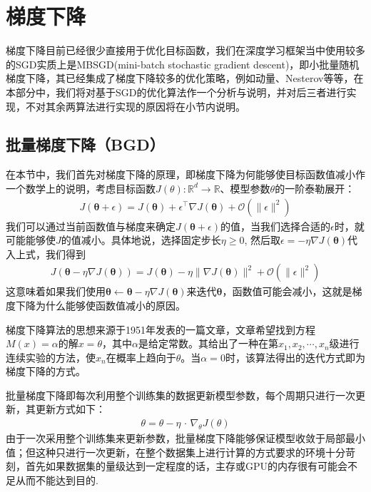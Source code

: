 \documentclass[10.5pt,a4paper]{article}%
\begin{document}
        \section{梯度下降}
        梯度下降目前已经很少直接用于优化目标函数，我们在深度学习框架当中使用较多的SGD实质上是MBSGD(mini-batch stochastic gradient descent)，即小批量随机梯度下降，其已经集成了梯度下降较多的优化策略，例如动量、Nesterov等等，在本部分中，我们将对基于SGD的优化算法作一个分析与说明，并对后三者进行实现，不对其余两算法进行实现的原因将在小节内说明。
        \subsection{批量梯度下降（BGD）}
            在本节中，我们首先对梯度下降的原理，即梯度下降为何能够使目标函数值减小作一个数学上的说明，考虑目标函数$J(\theta): \mathbb{R}^d\to\mathbb{R}$、模型参数$\theta$的一阶泰勒展开：
            \begin{align*}
                J(\mathbf{\theta}+\epsilon)=J(\mathbf{\theta})+\epsilon^{\top}\nabla J(\mathbf{\theta})+\mathcal{O}(\|\epsilon\|^2)
            \end{align*}
            我们可以通过当前函数值与梯度来确定$J(\mathbf{\theta}+\epsilon)$的值，当我们选择合适的$\epsilon$时，就可能能够使$J$的值减小。具体地说，选择固定步长$\eta\ge 0$, 然后取$\epsilon=-\eta\nabla J(\mathbf{\theta})$代入上式，我们得到
            \begin{align*}
                J(\mathbf{\theta}-\eta\nabla J(\mathbf{\theta}))=J(\mathbf{\theta})-\eta\|\nabla J(\mathbf{\theta})\|^2+\mathcal{O}(\|\epsilon\|^2)
            \end{align*}
            这意味着如果我们使用$\mathbf{\theta}\gets\mathbf{\theta}-\eta\nabla J(\mathbf{\theta})$来迭代$\mathbf{\theta}$，函数值可能会减小，这就是梯度下降为什么能够使函数值减小的原因。\par
            梯度下降算法的思想来源于1951年发表的一篇文章\cite{sgd}，文章希望找到方程$M(x) = \alpha$的解$x = \theta$，其中$\alpha$是给定常数。其给出了一种在第$x_1,x_2,\cdots,x_n$级进行连续实验的方法，使$x_n$在概率上趋向于$\theta$。当$\alpha=0$时，该算法得出的迭代方式即为梯度下降的方式。\par
            批量梯度下降即每次利用整个训练集的数据更新模型参数，每个周期只进行一次更新，其更新方式如下：
            \begin{align*}
                \theta = \theta-\eta\,\cdot\,\nabla_\theta J(\theta)
            \end{align*}
            由于一次采用整个训练集来更新参数，批量梯度下降能够保证模型收敛于局部最小值；但这种只进行一次更新，在整个数据集上进行计算的方式要求的环境十分苛刻，首先如果数据集的量级达到一定程度的话，主存或GPU的内存很有可能会不足从而不能达到目的.
\end{document}
